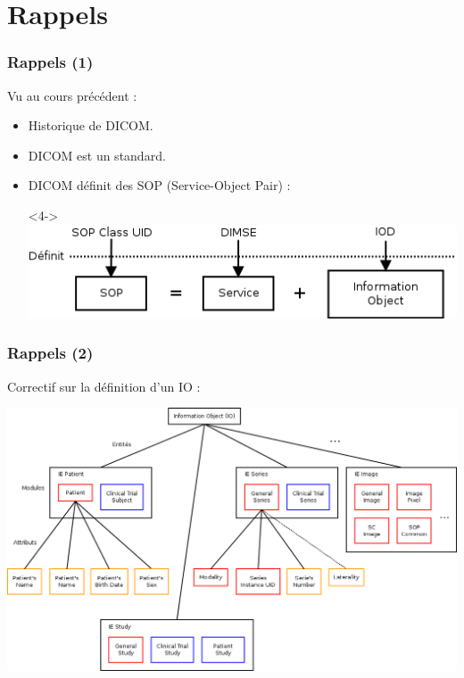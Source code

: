 \section{Rappels}

\frame
{
	\frametitle{Rappels (1)}
	Vu au cours pr\'ec\'edent :
	\begin{itemize}
		\item<1-> Historique de DICOM.
		\item<2-> DICOM est un standard.
		\item<3-> DICOM d\'efinit des SOP (Service-Object Pair) :
		\begin{center}<4->
			\includegraphics[width=.5\linewidth]{./figures/sop-definition.png}
		\end{center}
	
	\end{itemize}
}

\frame
{
	\frametitle{Rappels (2)}
	Correctif sur la d\'efinition d'un IO :
	\begin{center}
		\includegraphics[width=.5\linewidth]{./figures/IO-definition.png}
	\end{center}
}

